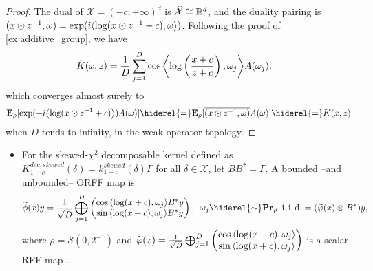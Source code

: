 \begin{proof}
The dual of $\mathcal{X}=(-c;+\infty)^d$
is $\dual{\mathcal{X}}\cong\mathbb{R}^d$, and the duality pairing is $\pairing{x \odot \myinv{z},\omega}=\exp(i\inner{\log(x\odot z^{-1}+c), \omega})$. Following the proof of \cref{ex:additive_group}, we have
\begin{equation*}
\begin{aligned}
\tilde{K}(x,z)&= \frac{1}{D} \sum_{j=1}^D \cos{\inner*{\log\left(\frac{x+c}{z+c}\right), \omega_j}}A(\omega_j).
\end{aligned}
\end{equation*}
which converges almost surely to
\begin{dmath*}
\expectation_{\rho}[\exp(-i\inner*{\log(x\odot z^{-1}+c)})A(\omega) ]\hiderel{=}\expectation_{\rho}[\conj{\pairing{x\odot z^{-1},\omega}}A(\omega)]\hiderel{=}K(x, z)
\end{dmath*}
when $D$ tends to infinity, in the weak operator topology.
\end{proof}
\begin{itemize}
\item For the skewed-$\chi^2$ decomposable kernel defined as $K_{1-c}^{dec,skewed}(\delta)=k_{1-c}^{skewed}(\delta)\Gamma$ for all $\delta\in\mathcal{X}$, let $BB^*=\Gamma$. A bounded --and unbounded-- \acs{ORFF} map is
\begin{dmath*}
\tildePhi{1:D}(x)y=\frac{1}{\sqrt{D}}\Vect_{j=1}^D\begin{pmatrix}\cos{\inner{\log(x+c),\omega_j}}B^\adjoint y\\ \sin{\inner{\log(x+c),\omega_j}}B^\adjoint y\end{pmatrix}, \enskip \omega_j \hiderel{\sim} \probability_{\rho} \enskip\text{\iid}
=(\tildephi{1:D}(x) \otimes B^\adjoint)y,
\end{dmath*}
where $\rho=\mathcal{S}(0,2^{-1})$ and $\tildephi{1:D}(x)=\frac{1}{\sqrt{D}}\Vect_{j=1}^D\begin{pmatrix}\cos{\inner{\log(x+c),\omega_j}} \\ \sin{\inner{\log(x+c),\omega_j}}\end{pmatrix}$ is a scalar \acs{RFF} map \cite{li2010random}.
\end{itemize}
